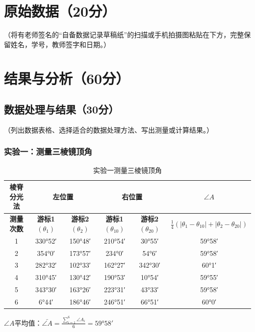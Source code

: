 \documentclass[]{../template/Report}%
\begin{document}
\begin{fullreportonly}
\section{原始数据（20分）}
（将有老师签名的“自备数据记录草稿纸”的扫描或手机拍摄图粘贴在下方，完整保留姓名，学号，教师签字和日期。）

\section{结果与分析（60分）}
\subsection{数据处理与结果（30分）}
（列出数据表格、选择适合的数据处理方法、写出测量或计算结果。）

\subsubsection{实验一：测量三棱镜顶角}
\begin{table}[H]
    \centering
    \caption{实验一测量三棱镜顶角}
    \begin{tabular}{|c|c|c|c|c|c|}
        \hline
        \textbf{棱脊分光法} & 
        \multicolumn{2}{|c|}{\textbf{左位置}} &
        \multicolumn{2}{|c|}{\textbf{右位置}} &
        \textbf{$\angle A$}  \\
        \hline
        \textbf{测量次数} & \textbf{游标1$(\theta_1)$} & \textbf{游标2$(\theta_2)$} & \textbf{游标1$(\theta_{10})$} & \textbf{游标2$(\theta_{20})$} & \textbf{$\frac{1}{4}(|\theta_1 - \theta_{10}| + |\theta_2 - \theta_{20}|)$}  \\
        \hline
        1 & \ang{330;52} & \ang{150;48} & \ang{210;54} & \ang{30;55} & \ang{59;58}  \\
        \hline
        2 & \ang{354;0} & \ang{173;57} & \ang{234;0} & \ang{54;6} & \ang{59;58}  \\
        \hline
        3 & \ang{282;32} & \ang{102;33} & \ang{162;27} & \ang{342;30} & \ang{60;1}  \\
        \hline
        4 & \ang{310;45} & \ang{130;42} & \ang{190;53} & \ang{10;54} & \ang{59;55}  \\
        \hline
        5 & \ang{343;30} & \ang{163;26} & \ang{223;31} & \ang{43;33} & \ang{59;58}  \\
        \hline
        6 & \ang{6;44} & \ang{186;46} & \ang{246;51} & \ang{66;51} & \ang{60;0}  \\
        \hline
    \end{tabular}
\end{table}
$\angle A$平均值：$\bar{\angle A} = \frac{\displaystyle\sum_{i=1}^6 \angle A_i}{6} = \ang{59;58}$


\end{fullreportonly}
\end{document}
